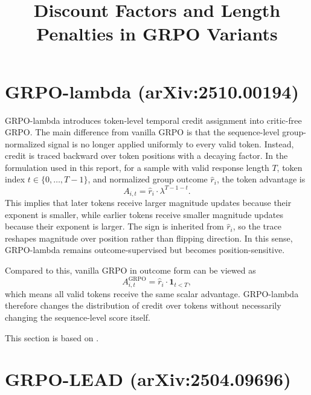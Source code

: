 \documentclass[11pt]{article}
\title{Discount Factors and Length Penalties in GRPO Variants}
\author{}
\date{}
\begin{document}
\maketitle

\section{GRPO-lambda (arXiv:2510.00194)}

GRPO-lambda introduces token-level temporal credit assignment into critic-free GRPO. The main difference from vanilla GRPO is that the sequence-level group-normalized signal is no longer applied uniformly to every valid token. Instead, credit is traced backward over token positions with a decaying factor. In the formulation used in this report, for a sample with valid response length $T$, token index $t \in \{0,\dots,T-1\}$, and normalized group outcome $\hat r_i$, the token advantage is
\begin{equation}
A_{i,t} = \hat r_i \cdot \lambda^{T-1-t}.
\end{equation}
This implies that later tokens receive larger magnitude updates because their exponent is smaller, while earlier tokens receive smaller magnitude updates because their exponent is larger. The sign is inherited from $\hat r_i$, so the trace reshapes magnitude over position rather than flipping direction. In this sense, GRPO-lambda remains outcome-supervised but becomes position-sensitive.

Compared to this, vanilla GRPO in outcome form can be viewed as
\begin{equation}
A^{\mathrm{GRPO}}_{i,t} = \hat r_i \cdot \mathbf{1}_{t<T},
\end{equation}
which means all valid tokens receive the same scalar advantage. GRPO-lambda therefore changes the distribution of credit over tokens without necessarily changing the sequence-level score itself.

This section is based on \cite{grpo-lambda}.

\section{GRPO-LEAD (arXiv:2504.09696)}
\end{document}
